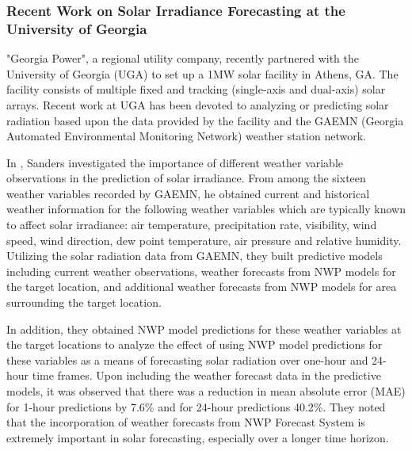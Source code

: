 \subsubsection*{Recent Work on Solar Irradiance Forecasting at the University of Georgia}
\par "Georgia Power", a regional utility company, recently partnered with the University of Georgia (UGA) to set up a 1MW solar facility in Athens, GA. The facility consists of multiple fixed and tracking (single-axis and dual-axis) solar arrays. Recent work at UGA has been devoted to analyzing or predicting solar radiation based upon the data provided by the facility and the GAEMN (Georgia Automated Environmental Monitoring Network) weather station network.

\par In \cite{publication_sanders}, Sanders investigated the importance of different weather variable observations in the prediction of solar irradiance. From among the sixteen weather variables recorded by GAEMN, he obtained current and historical weather information for the following weather variables which are typically known to affect solar irradiance: air temperature, precipitation rate, visibility, wind speed, wind direction, dew point temperature, air pressure and relative humidity. Utilizing the solar radiation data from GAEMN, they built predictive models including current weather observations, weather forecasts from NWP models for the target location, and additional weather forecasts from NWP models for area surrounding the target location. 

\par In addition, they obtained NWP model predictions for these weather variables at the target locations to analyze the effect of using NWP model predictions for these variables as a means of forecasting solar radiation over one-hour and 24-hour time frames. Upon including the weather forecast data in the predictive models, it was observed that there was a reduction in mean absolute error (MAE) for 1-hour predictions by 7.6\% and for 24-hour predictions 40.2\%. They noted that the incorporation of weather forecasts from NWP Forecast System is extremely important in solar forecasting, especially over a longer time horizon. 

